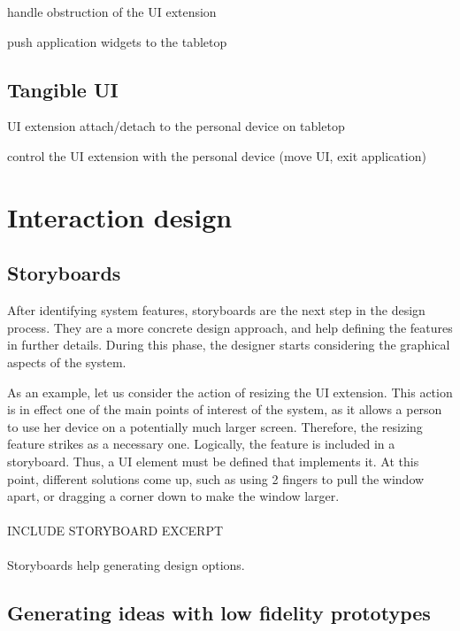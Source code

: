  handle obstruction of the UI extension

 push application widgets to the tabletop

\subsection{Tangible UI}

 UI extension attach/detach to the personal device on tabletop

 control the UI extension with the personal device (move UI, exit application)

\section{Interaction design}

\subsection{Storyboards}

After identifying system features, storyboards are the next step in the design process.
They are a more concrete design approach, and help defining the features in further details.
During this phase, the designer starts considering the graphical aspects of the system.

As an example, let us consider the action of resizing the UI extension.
This action is in effect one of the main points of interest of the system, as it allows a person to use her device on a potentially much larger screen.
Therefore, the resizing feature strikes as a necessary one.
Logically, the feature is included in a storyboard.
Thus, a UI element must be defined that implements it.
At this point, different solutions come up, such as using 2 fingers to pull the window apart, or dragging a corner down to make the window larger.
\\\\
INCLUDE STORYBOARD EXCERPT
\\\\
Storyboards help generating design options.

\subsection{Generating ideas with low fidelity prototypes}

%
%

